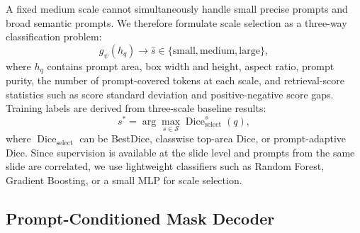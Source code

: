 \documentclass[letterpaper]{article} %
\begin{document}
A fixed medium scale cannot simultaneously handle small precise prompts and broad semantic prompts. We therefore formulate scale selection as a three-way classification problem:
\begin{equation}
    g_{\psi}(h_q) \rightarrow \hat{s}\in\{\mathrm{small},\mathrm{medium},\mathrm{large}\},
\end{equation}
where $h_q$ contains prompt area, box width and height, aspect ratio, prompt purity, the number of prompt-covered tokens at each scale, and retrieval-score statistics such as score standard deviation and positive-negative score gaps. Training labels are derived from three-scale baseline results:
\begin{equation}
    s^{*}=\arg\max_{s\in\mathcal{S}} \operatorname{Dice}_{\mathrm{select}}^{s}(q),
\end{equation}
where $\operatorname{Dice}_{\mathrm{select}}$ can be BestDice, classwise top-area Dice, or prompt-adaptive Dice. Since supervision is available at the slide level and prompts from the same slide are correlated, we use lightweight classifiers such as Random Forest, Gradient Boosting, or a small MLP for scale selection.

\subsection{Prompt-Conditioned Mask Decoder}
\end{document}
